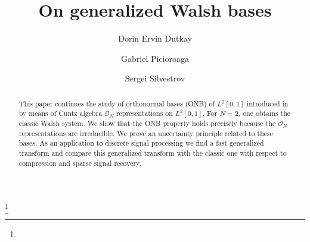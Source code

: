 \documentclass[11pt]{amsart}
\theoremstyle{definition}
\theoremstyle{remark}
\numberwithin{equation}{section}
\begin{document}
\title[On generalized Walsh bases]{On generalized Walsh bases}
\author{Dorin Ervin Dutkay}

\address{[Dorin Ervin Dutkay] University of Central Florida\\
	Department of Mathematics\\
	4000 Central Florida Blvd.\\
	P.O. Box 161364\\
	Orlando, FL 32816-1364\\
U.S.A.\\} 

\author{Gabriel Picioroaga}
\address{
[Gabriel Picioroaga] University of South Dakota\\
Department of Mathematical Sciences\\
414 E. Clark Street\\
Vermillion, SD, 57069\\
U.S.A\\}

\author{Sergei Silvestrov}
\address{[Sergei Silvestrov] Division of Applied Mathematics\\
The School of Education, Culture and Communication (UKK)\\
M\" alardalen University\\
Box 883, 721 23 V\" aster\aa s, Sweden} 

\thanks{}
\subjclass[2000]{}




\begin{abstract} This paper continues the study of orthonormal bases (ONB) of $L^2[0,1]$ introduced in \cite{DPS14} by means of Cuntz algebra $\mathcal{O}_N$ representations on $L^2[0,1]$. For $N=2$, one obtains the classic Walsh system. We show that the ONB property holds precisely because the $\mathcal{O}_N$ representations are irreducible. We prove an uncertainty principle related to these bases. As an application to discrete signal processing we find a fast generalized transform and compare this generalized transform with the classic one with respect to compression and sparse signal recovery. 

\end{abstract}
\maketitle \tableofcontents
\end{document}
